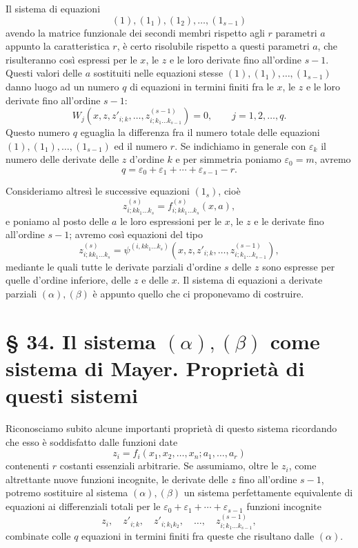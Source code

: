 \documentclass[11pt]{book}
\begin{document}
Il sistema di equazioni
\[
 (1),(1_1),(1_2),\ldots,(1_{s-1})
\]
avendo la matrice funzionale dei secondi membri rispetto agli $r$ parametri $a$ appunto la caratteristica $r$, è certo risolubile rispetto a questi parametri $a$, che risulteranno così espressi per le $x$, le $z$ e le loro derivate fino all'ordine $s-1$. Questi valori delle $a$ sostituiti nelle equazioni stesse $(1),(1_1),\ldots,(1_{s-1})$ danno luogo ad un numero $q$ di equazioni in termini finiti fra le $x$, le $z$ e le loro derivate fino all'ordine $s-1$:
\begin{equation*}\tag{$\alpha$}
 W_j(x,z,z'_{i;k},\ldots,z^{(s-1)}_{i;k_1\ldots k_{s-1}})=0,
 \qquad j=1,2,\ldots,q.
\end{equation*}
Questo numero $q$ eguaglia la differenza fra il numero totale delle equazioni $(1),(1_1),\ldots,(1_{s-1})$ ed il numero $r$. Se indichiamo in generale con $\varepsilon_k$ il numero delle derivate delle $z$ d'ordine $k$\begingroup\renewcommand\thefootnote{(*)}\footnotemark\endgroup{} e per simmetria poniamo $\varepsilon_0=m$, avremo
\begingroup\renewcommand\thefootnote{(*)}\endgroup{}
\begin{equation*}\tag{2}
 q=\varepsilon_0+\varepsilon_1+\cdots+\varepsilon_{s-1}-r.
\end{equation*}

Consideriamo altresì le successive equazioni $(1_s)$, cioè
\[
 z^{(s)}_{i;kk_1\ldots k_s}=f^{(s)}_{i;kk_1\ldots k_s}(x,a),
\]
e poniamo al posto delle $a$ le loro espressioni per le $x$, le $z$ e le derivate fino all'ordine $s-1$; avremo così equazioni del tipo
\begin{equation*}\tag{$\beta$}
 z^{(s)}_{i;kk_1\ldots k_s}
 =\psi^{(i,kk_1\ldots k_s)}(x,z,z'_{i;k},\ldots,z^{(s-1)}_{i;k_1\ldots k_{s-1}}),
\end{equation*}
mediante le quali tutte le derivate parziali d'ordine $s$ delle $z$ sono espresse per quelle d'ordine inferiore, delle $z$ e delle $x$. Il sistema di equazioni a derivate parziali $(\alpha),(\beta)$ è appunto quello che ci proponevamo di costruire.

\section*{\S{} 34. Il sistema $(\alpha),(\beta)$ come sistema di Mayer. Proprietà di questi sistemi}

Riconosciamo subito alcune importanti proprietà di questo sistema ricordando che esso è soddisfatto dalle funzioni date
\[
 z_i=f_i(x_1,x_2,\ldots,x_n; a_1,\ldots,a_r)
\]
contenenti $r$ costanti essenziali arbitrarie. Se assumiamo, oltre le $z_i$, come altrettante nuove funzioni incognite, le derivate delle $z$ fino all'ordine $s-1$, potremo sostituire al sistema $(\alpha),(\beta)$ un sistema perfettamente equivalente di equazioni ai differenziali totali per le $\varepsilon_0+\varepsilon_1+\cdots+\varepsilon_{s-1}$ funzioni incognite
\[
 z_i,
 \quad z'_{i;k},
 \quad z'_{i;k_1k_2},
 \quad \ldots,
 \quad z^{(s-1)}_{i;k_1\ldots k_{s-1}},
\]
combinate colle $q$ equazioni in termini finiti fra queste che risultano dalle $(\alpha)$.
\end{document}
